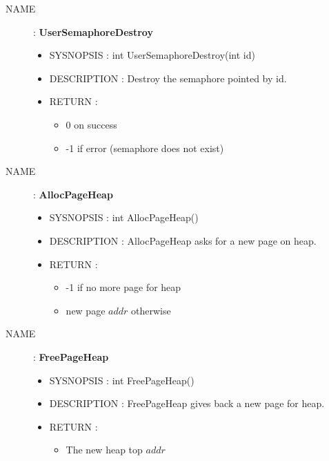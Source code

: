 \begin{description}
    \item [NAME] : \textbf{UserSemaphoreDestroy}
        \begin{itemize}
            \item SYSNOPSIS : int UserSemaphoreDestroy(int id)
            \item DESCRIPTION :
                Destroy the semaphore pointed by id.
            \item RETURN :
                \begin{itemize}
                    \item 0 on success
                    \item -1 if error (semaphore does not exist)
                \end{itemize}
        \end{itemize}

    \item [NAME] : \textbf{AllocPageHeap}
        \begin{itemize}
            \item SYSNOPSIS : int AllocPageHeap()
            \item DESCRIPTION :
                AllocPageHeap asks for a new page on heap.
            \item RETURN :
                \begin{itemize}
                    \item -1 if no more page for heap
                    \item new page $addr$ otherwise
                \end{itemize}
        \end{itemize}

    \item [NAME] : \textbf{FreePageHeap}
        \begin{itemize}
            \item SYSNOPSIS : int FreePageHeap()
            \item DESCRIPTION :
                FreePageHeap gives back a new page for heap.
            \item RETURN :
                \begin{itemize}
                    \item The new heap top $addr$
                \end{itemize}
        \end{itemize}


\end{description}
